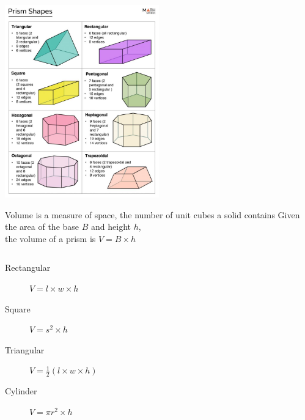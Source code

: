 \begin{frame}
  \includegraphics[width=0.5\textwidth]{../graphics/prism-shapes-768x960.jpeg}
\end{frame}

\begin{frame}{Volume is a measure of space, the number of unit cubes a solid contains}
  Given the area of the base $B$ and height $h$, \\
  the volume of a prism is $V= B \times h$
  \vspace{0.5cm}
  \begin{columns}
    \begin{description}
      \item[Rectangular] $V= l \times w \times h$
      \item[Square] $V= s^2 \times h$
      \item[Triangular] $V= \frac{1}{2} (l \times w \times h)$
      \item[Cylinder] $V= \pi r^2 \times h$ 
    \end{description}
  \end{columns} \vspace{0.5cm}
  \end{frame}

